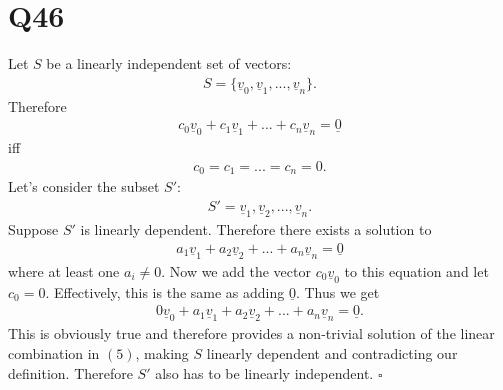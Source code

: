 \documentclass{article}
\renewcommand{\vec}{\underline}
\begin{document}
\section*{Q46}
Let $S$ be a linearly independent set of vectors:
\begin{align}
    S=\{\vec v_0, \vec v_1, ..., \vec v_n\}.
\end{align}
Therefore
\begin{align}
    c_0\vec v_0 + c_1\vec v_1 + ... + c_n\vec v_n = \vec 0
\end{align}
iff
\begin{align}
    c_0 = c_1 = ... = c_n = 0.
\end{align}
Let's consider the subset $S'$:
\begin{align}
    S'={\vec v_1, \vec v_2, ..., \vec v_n}.
\end{align}
Suppose $S'$ is linearly dependent. Therefore there exists a solution to
\begin{align}
    a_1\vec v_1 + a_2\vec v_2 + ... + a_n\vec v_n = \vec 0
\end{align}
where at least one $a_i\not=0$. Now we add the vector $c_0\vec v_0$ to this equation and let $c_0 = 0$.
Effectively, this is the same as adding $\vec 0$.
Thus we get
\begin{align}
    0\vec v_0 + a_1\vec v_1 + a_2\vec v_2 + ... + a_n\vec v_n = \vec 0.
\end{align}
This is obviously true and therefore provides a non-trivial solution of the linear combination in $(5)$, making $S$ linearly dependent and contradicting our definition.
Therefore $S'$ also has to be linearly independent. $\square$
\end{document}
